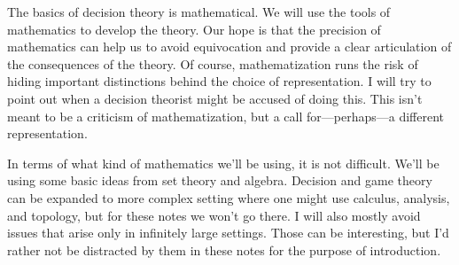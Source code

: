 \documentclass[justified,nobib]{tufte-book}
\begin{document}
 The basics of decision theory is mathematical.  We will use the tools of mathematics to develop the theory.  Our hope is that the precision of mathematics can help us to avoid equivocation and provide a clear articulation of the consequences of the theory.  Of course, mathematization runs the risk of hiding important distinctions behind the choice of representation.  I will try to point out when a decision theorist might be accused of doing this.  This isn't meant to be a criticism of mathematization, but a call for---perhaps---a different representation.

In terms of what kind of mathematics we'll be using, it is not difficult.  We'll be using some basic ideas from set theory and algebra.  Decision and game theory can be expanded to more complex setting where one might use calculus, analysis, and topology, but for these notes we won't go there.  I will also mostly avoid issues that arise only in infinitely large settings.  Those can be interesting, but I'd rather not be distracted by them in these notes for the purpose of introduction.

















\backmatter

\printbibliography
\end{document}
